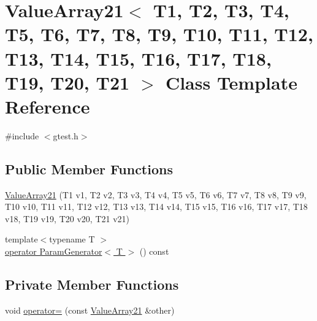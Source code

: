 \hypertarget{classtesting_1_1internal_1_1ValueArray21}{\section{\-Value\-Array21$<$ \-T1, \-T2, \-T3, \-T4, \-T5, \-T6, \-T7, \-T8, \-T9, \-T10, \-T11, \-T12, \-T13, \-T14, \-T15, \-T16, \-T17, \-T18, \-T19, \-T20, \-T21 $>$ \-Class \-Template \-Reference}
\label{d6/db9/classtesting_1_1internal_1_1ValueArray21}
}


{\ttfamily \#include $<$gtest.\-h$>$}

\subsection*{\-Public \-Member \-Functions}
\begin{DoxyCompactItemize}
\item 
\hyperlink{classtesting_1_1internal_1_1ValueArray21_a6010ddce06e997e068b932c52b444f40}{\-Value\-Array21} (\-T1 v1, \-T2 v2, \-T3 v3, \-T4 v4, \-T5 v5, \-T6 v6, \-T7 v7, \-T8 v8, \-T9 v9, \-T10 v10, \-T11 v11, \-T12 v12, \-T13 v13, \-T14 v14, \-T15 v15, \-T16 v16, \-T17 v17, \-T18 v18, \-T19 v19, \-T20 v20, \-T21 v21)
\item 
{\footnotesize template$<$typename T $>$ }\\\hyperlink{classtesting_1_1internal_1_1ValueArray21_a08ef46fa12c9dd8ef6fc630baeea89b7}{operator Param\-Generator$<$ T $>$} () const 
\end{DoxyCompactItemize}
\subsection*{\-Private \-Member \-Functions}
\begin{DoxyCompactItemize}
\item 
void \hyperlink{classtesting_1_1internal_1_1ValueArray21_a6921cea548b5d5429cb6f1da8dab9464}{operator=} (const \hyperlink{classtesting_1_1internal_1_1ValueArray21}{\-Value\-Array21} \&other)
\end{DoxyCompactItemize}
